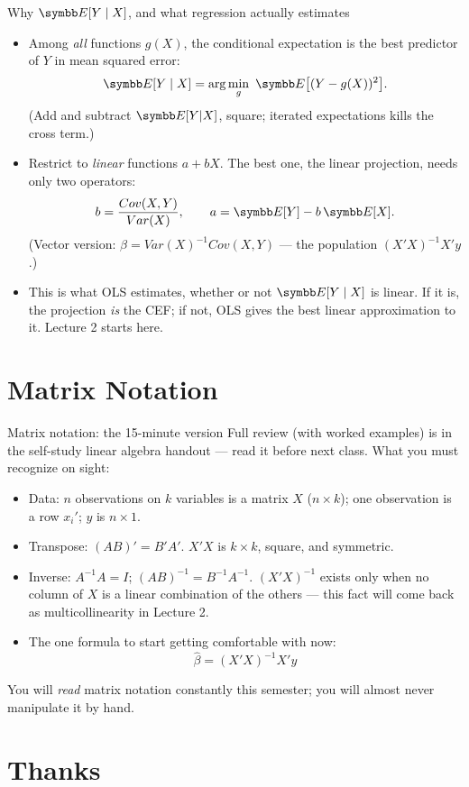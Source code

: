 \documentclass[aspectratio=169,11pt]{beamer}
\begin{document}
\begin{frame}{Why $\E[Y \mid X]$, and what regression actually estimates}
\begin{itemize}
	\item Among \emph{all} functions $g(X)$, the conditional expectation is the best predictor of $Y$
	in mean squared error:\[
		\E[Y \mid X] = \arg\min_{g}\ \E\big[(Y - g(X))^2\big].
	\]
	(Add and subtract $\E[Y|X]$, square; iterated expectations kills the cross term.)
	\medskip
	\item Restrict to \emph{linear} functions $a + bX$. The best one, the \alert{linear projection},
	needs only two operators:\[
		b = \frac{Cov(X, Y)}{Var(X)}, \qquad a = \E[Y] - b\,\E[X].
	\]
	(Vector version: $\beta = Var(X)^{-1} Cov(X, Y)$ --- the population $(X'X)^{-1}X'y$.)
	\medskip
	\item This is what OLS estimates, \alert{whether or not} $\E[Y \mid X]$ is linear. If it is, the
	projection \emph{is} the CEF; if not, OLS gives the best linear approximation to it. Lecture 2 starts here.
\end{itemize}
\end{frame}



\section{Matrix Notation}

\begin{frame}{Matrix notation: the 15-minute version}
Full review (with worked examples) is in the \alert{self-study linear algebra handout} --- read it before next class. What you must recognize on sight:
\begin{itemize}
	\item Data: $n$ observations on $k$ variables is a matrix $X$ ($n \times k$); one observation is a row $x_i'$; $y$ is $n \times 1$.

	\medskip
	\item Transpose: $(AB)' = B'A'$. \quad $X'X$ is $k\times k$, square, and symmetric.

	\medskip
	\item Inverse: $A^{-1}A = I$; \quad $(AB)^{-1} = B^{-1}A^{-1}$. \quad $(X'X)^{-1}$ exists only when
	no column of $X$ is a linear combination of the others --- this fact will come back as
	\alert{multicollinearity} in Lecture 2.

	\medskip
	\item The one formula to start getting comfortable with now:\[
		\hat{\beta} = \left(X'X\right)^{-1}X'y
	\]
\end{itemize}
\medskip
You will \emph{read} matrix notation constantly this semester; you will almost never manipulate it by hand.
\end{frame}


\section{Thanks}
\end{document}
